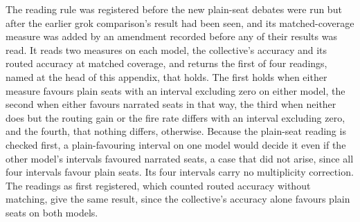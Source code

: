 The reading rule was registered before the new plain-seat debates were run
but after the earlier grok comparison's result had been seen, and its
matched-coverage measure was added by an amendment recorded before any of
their results was read.
It reads two measures on each model, the collective's accuracy and its
routed accuracy at matched coverage, and returns the first of four
readings, named at the head of this appendix, that holds. The first holds
when either measure favours plain seats with an interval excluding zero on
either model, the second when either favours narrated seats in that way,
the third when neither does but the routing gain or the fire rate differs
with an interval excluding zero, and the fourth, that nothing differs,
otherwise. Because the plain-seat reading is checked first, a
plain-favouring interval on one model would decide it even if the other
model's intervals favoured narrated seats, a case that did not arise, since
all four intervals favour plain seats. Its four intervals carry no
multiplicity correction. The readings as first registered, which counted
routed accuracy without matching, give the same result, since the
collective's accuracy alone favours plain seats on both models.
